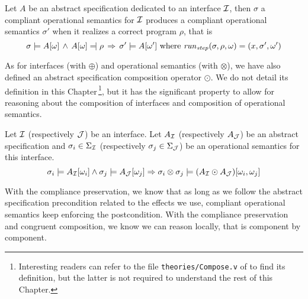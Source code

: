 \begin{theorem}
  Let $A$ be an abstract specification dedicated to an interface $\mathcal{I}$, then
  $\sigma$ a compliant operational semantics for $\mathcal{I}$ produces a compliant
  operational semantics $\sigma'$ when it realizes a correct program $\rho$,
  that is
  \[
    \sigma \models A[\omega]\,\wedge\,A[\omega] \modelssym \rho\,\Rightarrow\,
    \sigma' \models A[\omega'] \text{ where }\func{run}_{\func{step}}(\sigma,
    \rho, \omega) = (x, \sigma', \omega')
  \]
\end{theorem}

As for interfaces (with $\oplus$) and operational semantics (with $\otimes$), we
have also defined an abstract specification composition operator $\odot$.
%
We do not detail its definition in this Chapter\,\footnote{Interesting readers
  can refer to the file \texttt{theories/Compose.v} of
  \cite{letan2018freespeccode} to find its definition, but the latter is not
  required to understand the rest of this Chapter.}, but it has the significant
property to allow for reasoning about the composition of interfaces and
composition of operational semantics.

\begin{theorem}
  Let $\mathcal{I}$ (respectively $\mathcal{J}$) be an interface.
  Let $A_{\mathcal{I}}$ (respectively $A_{\mathcal{J}}$) be an abstract specification and
  $\sigma_i \in \Sigma_{\mathcal{I}}$ (respectively $\sigma_j \in \Sigma_{\mathcal{J}}$) be an
  operational semantics for this interface.
  \[ \sigma_i \models A_{\mathcal{I}}[\omega_i] \wedge \sigma_j \models A_{\mathcal{J}}[\omega_j]
    \Rightarrow \sigma_i \otimes \sigma_j \models (A_{\mathcal{I}} \odot
    A_{\mathcal{J}})[\omega_i, \omega_j]
  \]
\end{theorem}


With the compliance preservation, we know that as long as we follow the abstract
specification precondition related to the effects we use, compliant operational
semantics keep enforcing the postcondition.
%
With the compliance preservation and congruent composition, we know we can
reason locally, that is component by component.

